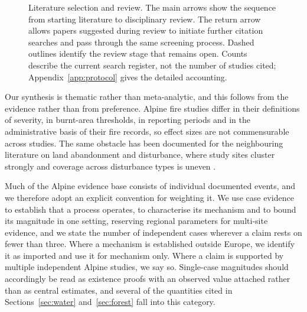 \documentclass[11pt,a4paper]{article}
\begin{document}
\begin{figure}[H]
\caption{Literature selection and review. The main arrows show the sequence from starting literature to disciplinary review. The return arrow allows papers suggested during review to initiate further citation searches and pass through the same screening process. Dashed outlines identify the review stage that remains open. Counts describe the current search register, not the number of studies cited; Appendix~\ref{app:protocol} gives the detailed accounting.}
\label{fig:flow}
\end{figure}

Our synthesis is thematic rather than meta-analytic, and this follows from the evidence rather than from preference. Alpine fire studies differ in their definitions of severity, in burnt-area thresholds, in reporting periods and in the administrative basis of their fire records, so effect sizes are not commensurable across studies. The same obstacle has been documented for the neighbouring literature on land abandonment and disturbance, where study sites cluster strongly and coverage across disturbance types is uneven \citep{mantero_influence_2020}.

Much of the Alpine evidence base consists of individual documented events, and we therefore adopt an explicit convention for weighting it. We use case evidence to establish that a process operates, to characterise its mechanism and to bound its magnitude in one setting, reserving regional parameters for multi-site evidence, and we state the number of independent cases wherever a claim rests on fewer than three. Where a mechanism is established outside Europe, we identify it as imported and use it for mechanism only. Where a claim is supported by multiple independent Alpine studies, we say so. Single-case magnitudes should accordingly be read as existence proofs with an observed value attached rather than as central estimates, and several of the quantities cited in Sections~\ref{sec:water} and~\ref{sec:forest} fall into this category.
\end{document}
